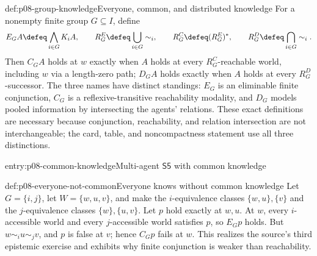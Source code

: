 \begin{hbdefinition}{def:p08-group-knowledge}{Everyone, common, and distributed knowledge}
For a nonempty finite group \(G\subseteq I\), define
\[
 E_GA\defeq\bigwedge_{i\in G}K_iA,
 \qquad
 R_G^{E}\defeq\bigcup_{i\in G}\sim_i,
 \qquad
 R_G^{C}\defeq(R_G^{E})^{*},
 \qquad
 R_G^{D}\defeq\bigcap_{i\in G}\sim_i.
\]
Then \(C_GA\) holds at \(w\) exactly when \(A\) holds at every
\(R_G^{C}\)-reachable world, including \(w\) via a length-zero path; \(D_GA\)
holds exactly when \(A\) holds at every \(R_G^{D}\)-successor.  The three
names have distinct standings: \(E_G\) is an eliminable finite conjunction,
\(C_G\) is a reflexive-transitive reachability modality, and \(D_G\) models
pooled information by intersecting the agents' relations.  These exact
definitions are necessary because conjunction, reachability, and relation
intersection are not interchangeable; the card, table, and noncompactness
statement use all three distinctions.
\end{hbdefinition}

\begin{systementry}{entry:p08-common-knowledge}{Multi-agent \(\mathsf{S5}\) with common knowledge}
\end{systementry}

\begin{hbexample}{def:p08-everyone-not-common}{Everyone knows without common knowledge}
Let \(G=\{i,j\}\), let \(W=\{w,u,v\}\), and make the \(i\)-equivalence
classes \(\{w,u\},\{v\}\) and the \(j\)-equivalence classes
\(\{w\},\{u,v\}\).  Let \(p\) hold exactly at \(w,u\).  At \(w\), every
\(i\)-accessible world and every \(j\)-accessible world satisfies \(p\), so
\(E_Gp\) holds.  But \(w\sim_i u\sim_j v\), and \(p\) is false at \(v\);
hence \(C_Gp\) fails at \(w\).  This realizes the source's third epistemic
exercise and exhibits why finite conjunction is weaker than reachability.
\end{hbexample}

